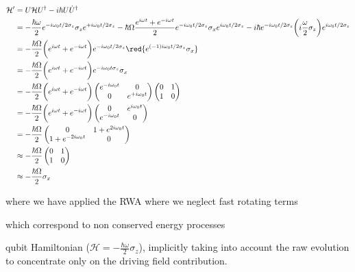   \begin{equation}\label{app2New}
    \begin{aligned}
      \mathcal{H'} & = U\mathcal{H}U^{\dagger} - i\hbar U\dot{U}^{\dagger}\\
      & = -\frac{\hbar\omega}{2}e^{-i\omega_0t/2\sigma_z}\sigma_ze^{+i\omega_0t/2\sigma_z}-\hbar\Omega\frac{e^{i\omega t}+e^{-i\omega t}}{2}e^{-i\omega_0t/2\sigma_z}\sigma_xe^{i\omega_0t/2\sigma_z}- i\hbar e^{-i\omega_0t/2\sigma_z}\bigg(i\frac{\omega}{2}\sigma_z\bigg)e^{i\omega_0t/2\sigma_z}\\
      & = -\frac{\hbar\Omega}{2}\bigg(e^{i\omega t}+e^{-i\omega t}\bigg)e^{-i\omega_0t/2\sigma_z}\red{e^{(-1)i\omega_0t/2\sigma_z}\sigma_x}\\
      & = -\frac{\hbar\Omega}{2}\bigg(e^{i\omega t}+e^{-i\omega t}\bigg){e^{-i\omega_0t\sigma_z}\sigma_x}\\
      &      =-\frac{\hbar\Omega}{2}\bigg(e^{i\omega      t}+e^{-i\omega
        t}\bigg)\begin{pmatrix} e^{-i\omega_0t}&0\\0&e^{+i\omega_0t}
      \end{pmatrix}\begin{pmatrix}
        0&1\\1&0
      \end{pmatrix}\\
      &      =-\frac{\hbar\Omega}{2}\bigg(e^{i\omega      t}+e^{-i\omega
        t}\bigg)\begin{pmatrix} 0&e^{i\omega_0t}\\e^{-i\omega_0t}&0
      \end{pmatrix}
      \\
      &                           =-\frac{\hbar\Omega}{2}\begin{pmatrix}
        0&1+e^{2i\omega_0t}\\1+e^{-2i\omega_0t}&0
      \end{pmatrix}
      \\
      & \approx -\frac{\hbar\Omega}{2}\begin{pmatrix} 0&1\\1&0
      \end{pmatrix}
      \\
      & \approx -\frac{\hbar\Omega}{2}\sigma_x
    \end{aligned}
  \end{equation}

  \noindent where we have applied the RWA where we neglect fast rotating
  terms \begin{framed}\noindent which correspond to non conserved energy
    processes
  \end{framed}                     qubit                     Hamiltonian
  ($ \mathcal{H} =  -\frac{\hbar\omega}{2}\sigma_z $), implicitly taking
  into  account the  raw evolution  to concentrate  only on  the driving
  field contribution.

